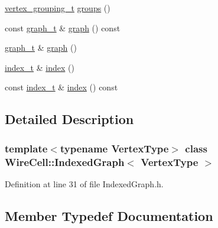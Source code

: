 \begin{DoxyCompactItemize}
\item 
\hyperlink{class_wire_cell_1_1_indexed_graph_af5e6a57c2c26d4f3036745cfe73a8a98}{vertex\+\_\+grouping\+\_\+t} \hyperlink{class_wire_cell_1_1_indexed_graph_a157b4fedc1ded6acf0479635cb97d8fc}{groups} ()
\item 
const \hyperlink{class_wire_cell_1_1_indexed_graph_a5593f08e4be84de33ebf37de7d071819}{graph\+\_\+t} \& \hyperlink{class_wire_cell_1_1_indexed_graph_a73e33d19b8b03611097aa02a2e72dd1d}{graph} () const
\item 
\hyperlink{class_wire_cell_1_1_indexed_graph_a5593f08e4be84de33ebf37de7d071819}{graph\+\_\+t} \& \hyperlink{class_wire_cell_1_1_indexed_graph_a91bb9fbf5b1106979cc5119e606cf396}{graph} ()
\item 
\hyperlink{class_wire_cell_1_1_indexed_graph_aae3465237209e244b48b594b6284526e}{index\+\_\+t} \& \hyperlink{class_wire_cell_1_1_indexed_graph_ab26c470b918ae39eafe091a10ae8b119}{index} ()
\item 
const \hyperlink{class_wire_cell_1_1_indexed_graph_aae3465237209e244b48b594b6284526e}{index\+\_\+t} \& \hyperlink{class_wire_cell_1_1_indexed_graph_af2f586142f41e1316192a4768f04c4b1}{index} () const
\end{DoxyCompactItemize}


\subsection{Detailed Description}
\subsubsection*{template$<$typename Vertex\+Type$>$\newline
class Wire\+Cell\+::\+Indexed\+Graph$<$ Vertex\+Type $>$}



Definition at line 31 of file Indexed\+Graph.\+h.



\subsection{Member Typedef Documentation}
\mbox{\label{class_wire_cell_1_1_indexed_graph_a7dabdef2dec280294d6ead6f0fdc66c8}} 
